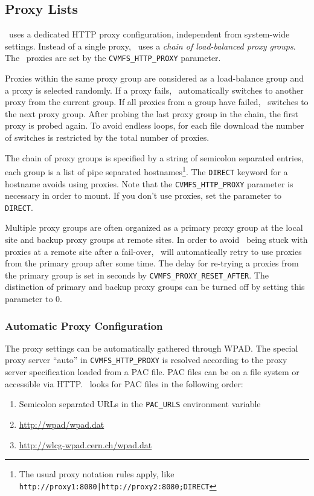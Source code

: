 \subsection{Proxy Lists}
\cvmfs\ uses a dedicated HTTP proxy configuration, independent from system-wide settings. 
Instead of a single proxy, \cvmfs\ uses a \emph{chain of load-balanced proxy groups}.
The \cvmfs\ proxies are set by the \texttt{CVMFS\_HTTP\_PROXY} parameter.

Proxies within the same proxy group are considered as a load-balance group and a proxy is selected randomly.
If a proxy fails, \cvmfs\ automatically switches to another proxy from the current group.
If all proxies from a group have failed, \cvmfs\ switches to the next proxy group.
After probing the last proxy group in the chain, the first proxy is probed again.
To avoid endless loops, for each file download the number of switches is restricted by the total number of proxies.

The chain of proxy groups is specified by a string of semicolon separated entries, each group is a list of pipe separated hostnames\footnote{The usual proxy notation rules apply, like \texttt{http://proxy1:8080|http://proxy2:8080;DIRECT}}.
The \texttt{DIRECT} keyword for a hostname avoids using proxies.
Note that the \texttt{CVMFS\_HTTP\_PROXY} parameter is necessary in order to mount.
If you don't use proxies, set the parameter to \texttt{DIRECT}.

Multiple proxy groups are often organized as a primary proxy group at the local site and backup proxy groups at remote sites.
In order to avoid \cvmfs\ being stuck with proxies at a remote site after a fail-over, \cvmfs\ will automatically retry to use proxies from the primary group after some time.
The delay for re-trying a proxies from the primary group is set in seconds by \texttt{CVMFS\_PROXY\_RESET\_AFTER}.
The distinction of primary and backup proxy groups can be turned off by setting this parameter to 0.

\subsubsection{Automatic Proxy Configuration}
The proxy settings can be automatically gathered through WPAD.
The special proxy server ``auto'' in \texttt{CVMFS\_HTTP\_PROXY} is resolved according to the proxy server specification loaded from a PAC file.
PAC files can be on a file system or accessible via HTTP.
\cvmfs\ looks for PAC files in the following order:
\begin{enumerate}
	\item Semicolon separated URLs in the \texttt{PAC\_URLS} environment variable
	\item \url{http://wpad/wpad.dat}
	\item \url{http://wlcg-wpad.cern.ch/wpad.dat}
\end{enumerate}


